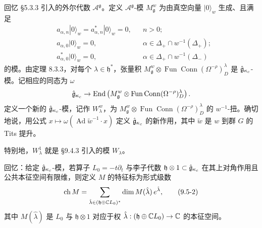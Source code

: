 回忆 §5.3.3 引入的外尔代数 $\mathcal{A}^{\mathfrak{g}}$。定义 $\mathcal{A}^{\mathfrak{g}}$-模 $M^w_{\mathfrak{g}}$ 为由真空向量 $|0\rangle_w$ 生成、且满足
\[
    \begin{aligned}
        &a_{\alpha,n}|0\rangle_w=a^*_{\alpha,n}|0\rangle_w=0, && n>0;\\
        &a_{\alpha,0}|0\rangle_w=0, && \alpha\in\Delta_+\cap w^{-1}(\Delta_+);\\
        &a^*_{\alpha,0}|0\rangle_w=0, && \alpha\in\Delta_+\cap w^{-1}(\Delta_-)
    \end{aligned}
\]
的模。由定理 8.3.3，对每个 $\lambda\in\mathfrak{h}^*$，张量积
$M^w_{\mathfrak{g}}\otimes\operatorname{Fun}\operatorname{Conn}(\Omega^{-\rho})^\lambda_D$ 是 $\hat{\mathfrak{g}}_{\kappa_c}$-模。记相应的同态为 $\omega$
\[
    \hat{\mathfrak{g}}_{\kappa_c}\to\operatorname{End}\left(M^w_{\mathfrak{g}}\otimes\operatorname{Fun}\operatorname{Conn}(\Omega^{-\rho})^\lambda_D\right).
\]
定义一个新的 $\hat{\mathfrak{g}}_{\kappa_c}$-模，记作 $W^w_\lambda$，为 $M^w_{\mathfrak{g}}\otimes\operatorname{Fun}\operatorname{Conn}(\Omega^{-\rho})^\lambda_D$ 的 $w^{-1}$-扭。确切地说，用公式 $x\mapsto\omega(\operatorname{Ad}\widetilde{w}^{-1}\cdot x)$ 定义 $\hat{\mathfrak{g}}_{\kappa_c}$ 的新作用，其中 $\widetilde{w}$ 是 $w$ 到群 $G$ 的 Tits 提升。

特别地，$W^1_\lambda$ 就是 §9.4.3 引入的模 $W_\lambda$。

回忆：给定 $\hat{\mathfrak{g}}_{\kappa_c}$-模，若算子 $L_0=-t\partial_t$ 与李子代数 $\mathfrak{h}\otimes1\subset\hat{\mathfrak{g}}_{\kappa_c}$ 在其上对角作用且公共本征空间有限维，则定义 $M$ 的特征标为形式级数
\begin{equation}
    \operatorname{ch}M=\sum_{\hat\lambda\in(\mathfrak{h}\oplus\mathbb{C} L_0)^*}\dim M(\hat\lambda)\,e^{\hat\lambda},
    \tag{9.5-2}
\end{equation}
其中 $M(\hat\lambda)$ 是 $L_0$ 与 $\mathfrak{h}\otimes1$ 对应于权 $\hat\lambda:(\mathfrak{h}\oplus\mathbb{C} L_0)\to\mathbb{C}$ 的本征空间。


